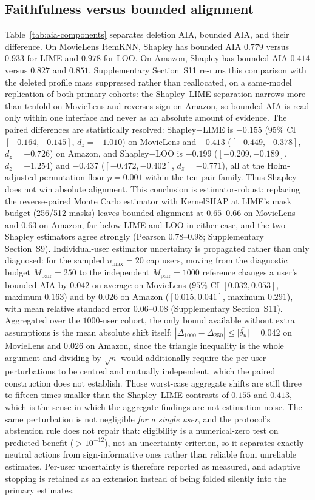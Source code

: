 \documentclass[manuscript,screen,review,anonymous]{acmart}
\begin{document}
\subsection{Faithfulness versus bounded alignment}
Table~\ref{tab:aia-components} separates deletion AIA, bounded AIA, and their difference. On MovieLens ItemKNN, Shapley has bounded AIA $0.779$ versus $0.933$ for LIME and $0.978$ for LOO. On Amazon, Shapley has bounded AIA $0.414$ versus $0.827$ and $0.851$. Supplementary Section~S11 re-runs this comparison with the deleted profile mass suppressed rather than reallocated, on a same-model replication of both primary cohorts: the Shapley--LIME separation narrows more than tenfold on MovieLens and reverses sign on Amazon, so bounded AIA is read only within one interface and never as an absolute amount of evidence. The paired differences are statistically resolved: Shapley$-$LIME is $-0.155$ (95\% CI $[-0.164,-0.145]$, $d_z=-1.010$) on MovieLens and $-0.413$ ($[-0.449,-0.378]$, $d_z=-0.726$) on Amazon, and Shapley$-$LOO is $-0.199$ ($[-0.209,-0.189]$, $d_z=-1.254$) and $-0.437$ ($[-0.472,-0.402]$, $d_z=-0.771$), all at the Holm-adjusted permutation floor $p=0.001$ within the ten-pair family. Thus Shapley does not win absolute alignment. This conclusion is estimator-robust: replacing the reverse-paired Monte Carlo estimator with KernelSHAP at LIME's mask budget (256/512 masks) leaves bounded alignment at $0.65$--$0.66$ on MovieLens and $0.63$ on Amazon, far below LIME and LOO in either case, and the two Shapley estimators agree strongly (Pearson $0.78$--$0.98$; Supplementary Section~S9). Individual-user estimator uncertainty is propagated rather than only diagnosed: for the sampled $n_{\max}=20$ cap users, moving from the diagnostic budget $M_{\mathrm{pair}}=250$ to the independent $M_{\mathrm{pair}}=1000$ reference changes a user's bounded AIA by $0.042$ on average on MovieLens ($95\%$ CI $[0.032,0.053]$, maximum $0.163$) and by $0.026$ on Amazon ($[0.015,0.041]$, maximum $0.291$), with mean relative standard error $0.06$--$0.08$ (Supplementary Section~S11). Aggregated over the $1000$-user cohort, the only bound available without extra assumptions is the mean absolute shift itself: $|\overline{\Delta_{1000}}-\overline{\Delta_{250}}|\le\overline{|\delta_u|}=0.042$ on MovieLens and $0.026$ on Amazon, since the triangle inequality is the whole argument and dividing by $\sqrt{n}$ would additionally require the per-user perturbations to be centred and mutually independent, which the paired construction does not establish. Those worst-case aggregate shifts are still three to fifteen times smaller than the Shapley--LIME contrasts of $0.155$ and $0.413$, which is the sense in which the aggregate findings are not estimation noise. The same perturbation is not negligible \emph{for a single user}, and the protocol's abstention rule does not repair that: eligibility is a numerical-zero test on predicted benefit ($>10^{-12}$), not an uncertainty criterion, so it separates exactly neutral actions from sign-informative ones rather than reliable from unreliable estimates. Per-user uncertainty is therefore reported as measured, and adaptive stopping is retained as an extension instead of being folded silently into the primary estimates.
\end{document}
